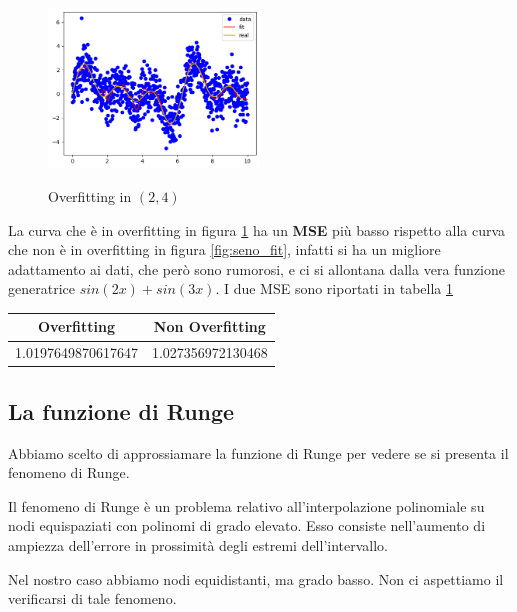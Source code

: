 \documentclass[../main.tex]{subfiles}
\begin{document}
\begin{figure}[ht]
    \caption{Overfitting in $(2,4)$}
    \includegraphics[width=0.5\textwidth]{Immagini/esempi/seno_overfit.png}
    \centering
    \label{fig:seno_overfitting}
\end{figure}
\begin{remark}
    La curva che è in overfitting in figura \ref{fig:seno_overfitting} ha un \textbf{MSE} più basso rispetto alla curva che non è in 
    overfitting in figura \ref{fig:seno_fit}, infatti si ha un migliore adattamento ai dati, che però sono rumorosi, e ci si allontana dalla 
    vera funzione generatrice $sin(2x) + sin(3x)$. I due MSE sono riportati in tabella \ref{tab:MSE}

    \begin{table}[h!]
        \centering
         \begin{tabular}{||c c ||} 
         \hline
         Overfitting & Non Overfitting \\ [0.5ex] 
         \hline\hline
         1.0197649870617647 & 1.027356972130468 \\  [1ex] 
         \hline
         \end{tabular}
         \label{tab:MSE}
        \end{table}
\end{remark}
\subsection{La funzione di Runge}
Abbiamo scelto di approssiamare la funzione di Runge per vedere se si presenta il fenomeno di Runge.
\begin{definition}
    Il fenomeno di Runge è un problema relativo all'interpolazione polinomiale su nodi equispaziati con polinomi di grado elevato. 
    Esso consiste nell'aumento di ampiezza dell'errore in prossimità degli estremi dell'intervallo.
\end{definition}
Nel nostro caso abbiamo nodi equidistanti, ma grado basso. Non ci aspettiamo il verificarsi di tale fenomeno.
\end{document}
